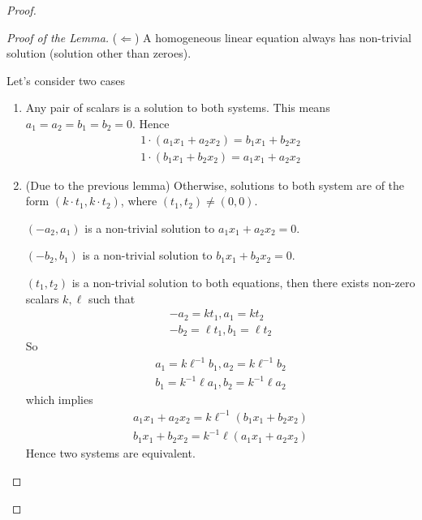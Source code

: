 \begin{proof}
\begin{proof}[Proof of the Lemma]
        ($\Leftarrow$) A homogeneous linear equation always has non-trivial solution (solution other than zeroes).

        Let's consider two cases
        \begin{enumerate}[label = \textbf{Case \arabic*.}, itemindent=1cm]
            \item Any pair of scalars is a solution to both systems.
                  This means $a_{1} = a_{2} = b_{1} = b_{2} = 0$. Hence
                  \[
                      \begin{split}
                          1\cdot (a_{1}x_{1} + a_{2}x_{2}) = b_{1}x_{1} + b_{2}x_{2} \\
                          1\cdot (b_{1}x_{1} + b_{2}x_{2}) = a_{1}x_{1} + a_{2}x_{2}
                      \end{split}
                  \]
            \item (Due to the previous lemma) Otherwise, solutions to both system are of the form $(k\cdot t_{1}, k\cdot t_{2})$, where $(t_{1}, t_{2})\ne (0, 0)$.

                  $(-a_{2}, a_{1})$ is a non-trivial solution to $a_{1}x_{1} + a_{2}x_{2} = 0$.

                  $(-b_{2}, b_{1})$ is a non-trivial solution to $b_{1}x_{1} + b_{2}x_{2} = 0$.

                  $(t_{1}, t_{2})$ is a non-trivial solution to both equations, then there exists non-zero scalars $k, \ell$ such that
                  \[
                      \begin{split}
                          -a_{2} = kt_{1}, a_{1} = kt_{2} \\
                          -b_{2} = \ell t_{1}, b_{1} = \ell t_{2}
                      \end{split}
                  \]
                  So
                  \[
                      \begin{split}
                          a_{1} = k\ell^{-1}b_{1}, a_{2} = k\ell^{-1}b_{2} \\
                          b_{1} = k^{-1}\ell a_{1}, b_{2} = k^{-1}\ell a_{2}
                      \end{split}
                  \]
                  which implies
                  \[
                      \begin{split}
                          a_{1}x_{1} + a_{2}x_{2} = k\ell^{-1}(b_{1}x_{1} + b_{2}x_{2}) \\
                          b_{1}x_{1} + b_{2}x_{2} = k^{-1}\ell(a_{1}x_{1} + a_{2}x_{2})
                      \end{split}
                  \]
                  Hence two systems are equivalent.\qedhere
        \end{enumerate}
    \end{proof}


\end{proof}
